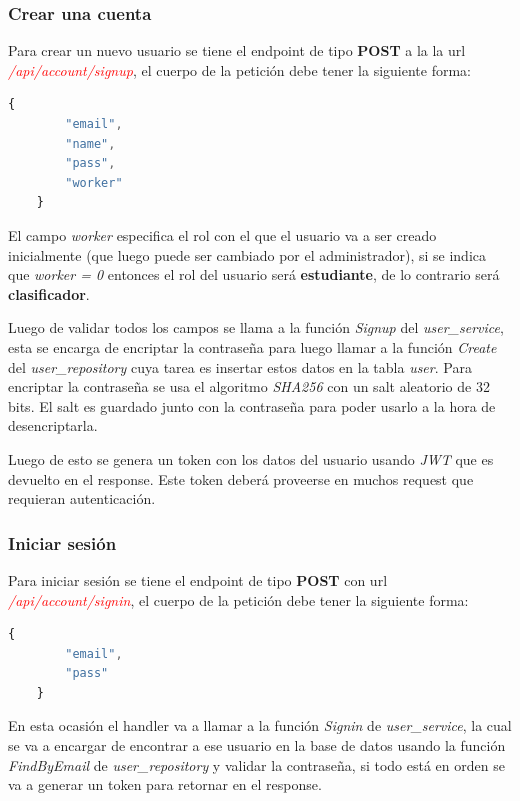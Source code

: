 \subsubsection{Crear una cuenta}

Para crear un nuevo usuario se tiene el endpoint de tipo \textbf{POST} a la la url \textit{\textcolor{red}{/api/account/signup}}, el cuerpo de la petición debe tener la siguiente forma:

\begin{lstlisting}[language=javascript]
	{
		"email",
		"name",
		"pass",
		"worker"
	}
\end{lstlisting}

El campo \textit{worker} especifica el rol con el que el usuario va a ser creado inicialmente (que luego puede ser cambiado por el administrador), si se indica que \textit{worker = 0} entonces el rol del usuario será \textbf{estudiante}, de lo contrario será \textbf{clasificador}.
\newline

Luego de validar todos los campos se llama a la función \textit{Signup} del \textit{user\_service}, esta se encarga de encriptar la contraseña para luego llamar a la función \textit{Create} del \textit{user\_repository} cuya tarea es insertar estos datos en la tabla \textit{user}. Para encriptar la contraseña se usa el algoritmo \textit{SHA256} con un salt aleatorio de 32 bits. El salt es guardado junto con la contraseña para poder usarlo a la hora de desencriptarla.
\newline

Luego de esto se genera un token con los datos del usuario usando \textit{JWT} que es devuelto en el response. Este token deberá proveerse en muchos request que requieran autenticación.
\newline

\subsubsection{Iniciar sesión}
Para iniciar sesión se tiene el endpoint de tipo \textbf{POST} con url \textit{\textcolor{red}{/api/account/signin}}, el cuerpo de la petición debe tener la siguiente forma:

\begin{lstlisting}[language=javascript]
	{
		"email",
		"pass"
	}
\end{lstlisting}

En esta ocasión el handler va a llamar a la función \textit{Signin} de \textit{user\_service}, la cual se va a encargar de encontrar a ese usuario en la base de datos usando la función \textit{FindByEmail} de \textit{user\_repository} y validar la contraseña, si todo está en orden se va a generar un token para retornar en el response.
\newline

